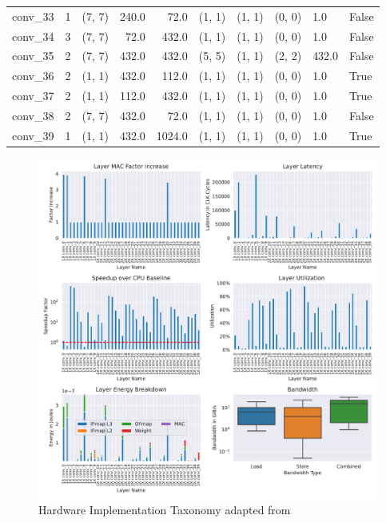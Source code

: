 \begin{center}
\begin{tabular}{lrlrrlllll}
        conv\_33 &      1 &      (7, 7) &  240.0 &    72.0 &  (1, 1) &  (1, 1) &  (0, 0) &    1.0 &  False \\
        conv\_34 &      3 &      (7, 7) &   72.0 &   432.0 &  (1, 1) &  (1, 1) &  (0, 0) &    1.0 &  False \\
        conv\_35 &      2 &      (7, 7) &  432.0 &   432.0 &  (5, 5) &  (1, 1) &  (2, 2) &  432.0 &  False \\
        conv\_36 &      2 &      (1, 1) &  432.0 &   112.0 &  (1, 1) &  (1, 1) &  (0, 0) &    1.0 &   True \\
        conv\_37 &      2 &      (1, 1) &  112.0 &   432.0 &  (1, 1) &  (1, 1) &  (0, 0) &    1.0 &   True \\
        conv\_38 &      2 &      (7, 7) &  432.0 &    72.0 &  (1, 1) &  (1, 1) &  (0, 0) &    1.0 &  False \\
        conv\_39 &      1 &      (1, 1) &  432.0 &  1024.0 &  (1, 1) &  (1, 1) &  (0, 0) &    1.0 &   True \\
        \bottomrule
        \end{tabular}
\end{center}


\begin{figure}[ht]
    \centering
    \includegraphics[scale=0.6]{Plots/networks/mobilenetv3_small_075.pdf}
    \caption{Hardware Implementation Taxonomy adapted from \cite{maestro}}
    \label{fig:hw_taxonomy}
\end{figure}
